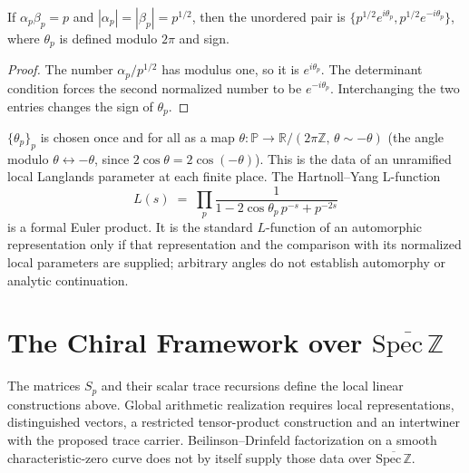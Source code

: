 \begin{proposition}
\label{v4-arith:prop:theta-p-is-satake}
If \(\alpha_p\beta_p=p\) and
\(|\alpha_p|=|\beta_p|=p^{1/2}\), then the unordered pair is
\(\{p^{1/2}e^{i\theta_p},p^{1/2}e^{-i\theta_p}\}\), where
\(\theta_p\) is defined modulo \(2\pi\) and sign.
\end{proposition}
\begin{proof}
The number \(\alpha_p/p^{1/2}\) has modulus one, so it is
\(e^{i\theta_p}\). The determinant condition forces the second
normalized number to be \(e^{-i\theta_p}\). Interchanging the two
entries changes the sign of \(\theta_p\).
\end{proof}

\begin{convention}
\(\{\theta_{p}\}_{p}\) is chosen once and for all as a map
\(\theta\colon\mathbb P\to\mathbb R/(2\pi\mathbb Z,\,\theta\sim-\theta)\)
(the angle modulo \(\theta\leftrightarrow-\theta\), since
\(2\cos\theta=2\cos(-\theta)\)). This is the data of an
unramified local Langlands parameter at each finite place. The
Hartnoll--Yang L-function
\begin{equation}
L(s)\;=\;\prod_{p}\frac{1}{1-2\cos\theta_{p}\,p^{-s}+p^{-2s}}
\end{equation}
is a formal Euler product. It is the standard \(L\)-function of an
automorphic representation only if that representation and the comparison
with its normalized local parameters are supplied; arbitrary angles do
not establish automorphy or analytic continuation.
\end{convention}



\section{The Chiral Framework over \(\overline{\mathrm{Spec}\,\mathbb{Z}}\)}
\label{v4-arith:kb:beilinson-framework}

The matrices \(S_p\) and their scalar trace recursions define the local
linear constructions above. Global arithmetic realization requires local
representations, distinguished vectors, a restricted tensor-product
construction and an intertwiner with the proposed trace carrier.
Beilinson--Drinfeld factorization on a smooth characteristic-zero curve
does not by itself supply those data over
\(\overline{\mathrm{Spec}\,\mathbb Z}\).

